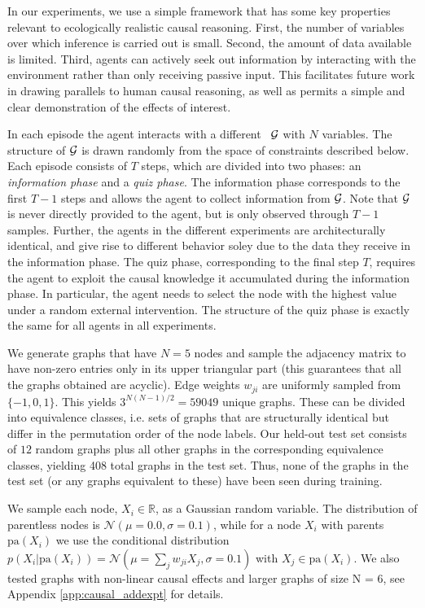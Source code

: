 In our experiments, we use a simple framework that has some key properties relevant to ecologically realistic causal reasoning. First, the number of variables over which inference is carried out is small. Second, the amount of data available is limited. Third, agents can actively seek out information by interacting with the environment rather than only receiving passive input. This facilitates future work in drawing parallels to human causal reasoning, as well as permits a simple and clear demonstration of the effects of interest.

In each episode the agent interacts with a different \CBN~${\cal G}$ with $N$ variables. The structure of ${\cal G}$ is drawn randomly from the space of constraints described below. Each episode consists of $T$ steps, which are divided into two phases: an \emph{information phase} and a \emph{quiz phase}. The information phase corresponds to the first $T-1$ steps and allows the agent to collect information from ${\cal G}$. Note that ${\cal G}$ is never directly provided to the agent, but is only observed through $T-1$ samples. Further, the agents in the different experiments are architecturally identical, and give rise to different behavior soley due to the data they receive in the information phase. The quiz phase, corresponding to the final step $T$, requires the agent to exploit the causal knowledge it accumulated during the information phase. In particular, the agent needs to select the node with the highest value under a random external intervention. The structure of the quiz phase is exactly the same for all agents in all experiments.

We generate graphs that have $N=5$ nodes and sample the adjacency matrix to have non-zero entries only in its upper triangular part (this guarantees that all the graphs obtained are acyclic). Edge weights $w_{ji}$ are uniformly sampled from $\{-1, 0, 1\}$. This yields $3^{N(N - 1)/2}=59049$ unique graphs. These can be divided into equivalence classes, i.e. sets of graphs that are structurally identical but differ in the permutation order of the node labels. Our held-out test set consists of $12$ random graphs plus all other graphs in the corresponding equivalence classes, yielding 408 total graphs in the test set. Thus, none of the graphs in the test set (or any graphs equivalent to these) have been seen during training.

We sample each node, $X_i \in \mathbb{R}$, as a Gaussian random variable. The distribution of parentless nodes is $\mathcal{N}(\mu=0.0, \sigma=0.1)$, while for a node $X_i$ with parents $\textrm{pa}(X_{i})$ we use the conditional distribution $p(X_i \vert \textrm{pa}(X_{i})) = \mathcal{N}(\mu=\sum_{j} w_{ji}X_{j}, \sigma=0.1)$ with $X_j \in \textrm{pa}(X_{i})$. We also tested graphs with non-linear causal effects and larger graphs of size N = 6, see Appendix \ref{app:causal_addexpt} for details. %

